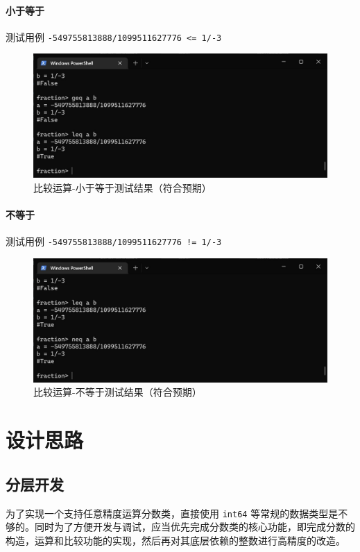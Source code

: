 \documentclass[cn,black,12pt,normal]{elegantnote}
\begin{document}
\paragraph{小于等于} 测试用例 \lstinline{-549755813888/1099511627776 <= 1/-3}
\begin{figure}[H]
    \centering
    \includegraphics[width=.8\textwidth]{imgs/test_r_leq.jpg}
    \caption{比较运算-小于等于测试结果（符合预期）}
\end{figure}

\paragraph{不等于} 测试用例 \lstinline{-549755813888/1099511627776 != 1/-3}
\begin{figure}[H]
    \centering
    \includegraphics[width=.8\textwidth]{imgs/test_r_neq.jpg}
    \caption{比较运算-不等于测试结果（符合预期）}
\end{figure}

\section{设计思路}

\subsection{分层开发}

为了实现一个支持任意精度运算分数类，直接使用 \lstinline{int64} 等常规的数据类型是不够的。同时为了方便开发与调试，应当优先完成分数类的核心功能，即完成分数的构造，运算和比较功能的实现，然后再对其底层依赖的整数进行高精度的改造。
\end{document}
